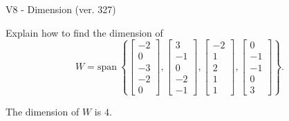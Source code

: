 \begin{exercise}
  \begin{exerciseTitle}V8 - Dimension (ver. 327)\end{exerciseTitle}
  \begin{exerciseStatement}
    Explain how to find the dimension of 
\[W=\mathrm{span}\ \left\{\left[\begin{array}{r}
-2 \\
0 \\
-3 \\
-2 \\
0
\end{array}\right] , \left[\begin{array}{r}
3 \\
-1 \\
0 \\
-2 \\
-1
\end{array}\right] , \left[\begin{array}{r}
-2 \\
1 \\
2 \\
1 \\
1
\end{array}\right] , \left[\begin{array}{r}
0 \\
-1 \\
-1 \\
0 \\
3
\end{array}\right]\right\}.\]



  \end{exerciseStatement}
  \begin{exerciseAnswer}
   The dimension of \(W\) is  \(4\).
  


  \end{exerciseAnswer}
\end{exercise}
